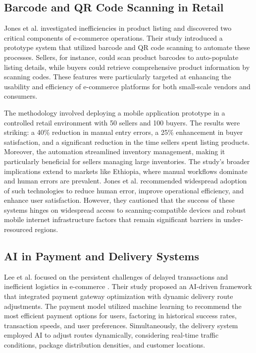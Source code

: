 \documentclass[12pt]{report}
\begin{document}
\subsection*{Barcode and QR Code Scanning in Retail}

Jones et al. investigated inefficiencies in product listing and discovered two critical
components of e-commerce operations. \cite{c17} Their study introduced a prototype system that
utilized barcode and QR code scanning to automate these processes. Sellers, for instance,
could scan product barcodes to auto-populate listing details, while buyers could retrieve
comprehensive product information by scanning codes. These features were particularly
targeted at enhancing the usability and efficiency of e-commerce platforms for both
small-scale vendors and consumers.

The methodology involved deploying a mobile application prototype in a controlled retail
environment with 50 sellers and 100 buyers. The results were striking: a 40\% reduction in
manual entry errors, a 25\% enhancement in buyer satisfaction, and a significant reduction in
the time sellers spent listing products. Moreover, the automation streamlined inventory
management, making it particularly beneficial for sellers managing large inventories. The
study’s broader implications extend to markets like Ethiopia, where manual workflows
dominate and human errors are prevalent. Jones et al. recommended widespread adoption of
such technologies to reduce human error, improve operational efficiency, and enhance user
satisfaction. However, they cautioned that the success of these systems hinges on widespread
access to scanning-compatible devices and robust mobile internet infrastructure factors that
remain significant barriers in under-resourced regions. \cite{c17}

\subsection*{AI in Payment and Delivery Systems}

Lee et al. focused on the persistent challenges of delayed transactions and inefficient logistics
in e-commerce \cite{c18}. Their study proposed an AI-driven framework that integrated payment
gateway optimization with dynamic delivery route adjustments. The payment model utilized
machine learning to recommend the most efficient payment options for users, factoring in
historical success rates, transaction speeds, and user preferences. Simultaneously, the delivery
system employed AI to adjust routes dynamically, considering real-time traffic conditions,
package distribution densities, and customer locations.
\end{document}
